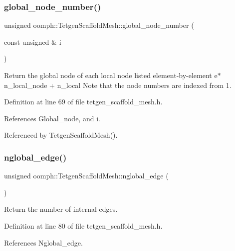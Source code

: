 \subsubsection{\texorpdfstring{global\+\_\+node\+\_\+number()}{global\_node\_number()}}
{\footnotesize\ttfamily unsigned oomph\+::\+Tetgen\+Scaffold\+Mesh\+::global\+\_\+node\+\_\+number (\begin{DoxyParamCaption}\item[{const unsigned \&}]{i }\end{DoxyParamCaption})\hspace{0.3cm}{\ttfamily [inline]}}



Return the global node of each local node listed element-\/by-\/element e$\ast$n\+\_\+local\+\_\+node + n\+\_\+local Note that the node numbers are indexed from 1. 



Definition at line 69 of file tetgen\+\_\+scaffold\+\_\+mesh.\+h.



References Global\+\_\+node, and i.



Referenced by Tetgen\+Scaffold\+Mesh().

\mbox{\label{classoomph_1_1TetgenScaffoldMesh_a4e92c46493f3ad4c1aadc45fadad3d99}} 
\subsubsection{\texorpdfstring{nglobal\+\_\+edge()}{nglobal\_edge()}}
{\footnotesize\ttfamily unsigned oomph\+::\+Tetgen\+Scaffold\+Mesh\+::nglobal\+\_\+edge (\begin{DoxyParamCaption}{ }\end{DoxyParamCaption})\hspace{0.3cm}{\ttfamily [inline]}}



Return the number of internal edges. 



Definition at line 80 of file tetgen\+\_\+scaffold\+\_\+mesh.\+h.



References Nglobal\+\_\+edge.

